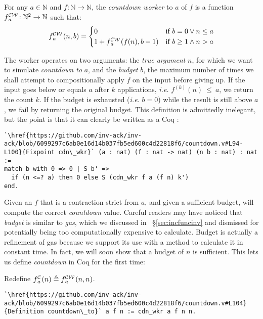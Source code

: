 \begin{defn} \label{defn: countdown-worker} \label{lem: cdt-init}
For any $a\in \mathbb{N}$ and $f: \mathbb{N}\to \mathbb{N}$, the \emph{countdown worker} to $a$ of $f$ is a function $\cdw{f}{a}\ : \mathbb{N}^2\to \mathbb{N}$ such that:
\begin{equation*}
\cdw{f}{a}(n, b) = \begin{cases}
0 & \text{if } b = 0 \vee n\le a \\ 1 +\cdw{f}{a}(f(n), b-1) & \text{if } b \ge 1 \wedge n > a
\end{cases}
\end{equation*}
\end{defn}
The worker operates on two arguments: 
the \emph{true argument} $n$, for which we want to simulate 
\emph{countdown to} $a$, 
and the \emph{budget} $b$, the maximum number of times we shall attempt 
to compositionally apply $f$ on the input before giving up. 
If the input goes below or equals $a$ after $k$ applications, \emph{i.e.} $f^{(k)}(n)~\le~a$, we return the count $k$. If the budget is exhausted (\emph{i.e.} $b = 0$) while the result is still above $a$, we fail by returning the original budget. This definition is admittedly inelegant, but the point is that it can clearly be written as a Coq :
\begin{lstlisting}
`\href{https://github.com/inv-ack/inv-ack/blob/6099297c6ab0e16d14b037fb5ed600c4d22818f6/countdown.v#L94-L100}{Fixpoint cdn\_wkr}` (a : nat) (f : nat -> nat) (n b : nat) : nat :=
match b with 0 => 0 | S b' => 
  if (n <=? a) then 0 else S (cdn_wkr f a (f n) k')
end.
\end{lstlisting}
Given an $f$ that is a contraction strict from $a$, 
and given a sufficient budget,  
will compute the correct \emph{countdown} value.  
Careful readers may have noticed that \emph{budget} is similar to 
\emph{gas}, which we discussed in ~\S\ref{sec:incfuncinv} 
and dismissed for potentially 
being too computationally expensive to calculate. 
Budget is actually a refinement of gas because 
we support its use with a method to calculate it in constant time.
In fact, we will soon show that a budget of $n$ is sufficient. 
This lets us define \emph{countdown} in Coq for the first time:
\begin{defn} \label{defn: countdown}
Redefine $\cdt{f}{a}(n) \triangleq \cdw{f}{a}(n, n)$.
\begin{lstlisting}
`\href{https://github.com/inv-ack/inv-ack/blob/6099297c6ab0e16d14b037fb5ed600c4d22818f6/countdown.v#L104}{Definition countdown\_to}` a f n := cdn_wkr a f n n.
\end{lstlisting}
\vspace{-0.8em}
\end{defn}

